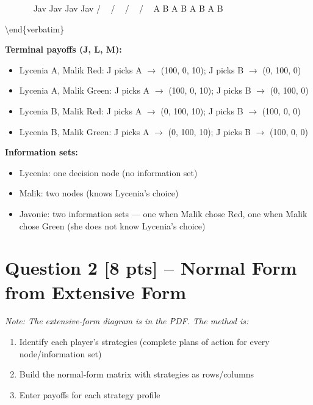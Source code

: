 \documentclass[
]{article}
\providecommand{\tightlist}{%
  \setlength{\itemsep}{0pt}\setlength{\parskip}{0pt}}
\begin{document}
~~~~~~\textbar{} \textbar{} Jav Jav Jav Jav / ~ / ~ / ~ / ~ A B A B A B
A B

\textbackslash end\{verbatim\}

\textbf{Terminal payoffs (J, L, M):}

\begin{itemize}
\tightlist
\item
  Lycenia A, Malik Red: J picks A \(\rightarrow\) (100, 0, 10); J picks
  B \(\rightarrow\) (0, 100, 0)
\item
  Lycenia A, Malik Green: J picks A \(\rightarrow\) (100, 0, 10); J
  picks B \(\rightarrow\) (0, 100, 0)
\item
  Lycenia B, Malik Red: J picks A \(\rightarrow\) (0, 100, 10); J picks
  B \(\rightarrow\) (100, 0, 0)
\item
  Lycenia B, Malik Green: J picks A \(\rightarrow\) (0, 100, 10); J
  picks B \(\rightarrow\) (100, 0, 0)
\end{itemize}

\textbf{Information sets:}

\begin{itemize}
\tightlist
\item
  Lycenia: one decision node (no information set)
\item
  Malik: two nodes (knows Lycenia's choice)
\item
  Javonie: two information sets --- one when Malik chose Red, one when
  Malik chose Green (she does not know Lycenia's choice)
\end{itemize}

\newpage

\section{Question 2 {[}8 pts{]} -- Normal Form from Extensive
Form}\label{question-2-8-pts-normal-form-from-extensive-form}

\emph{Note: The extensive-form diagram is in the PDF. The method is:}

\begin{enumerate}
\def\labelenumi{\arabic{enumi}.}
\tightlist
\item
  Identify each player's strategies (complete plans of action for every
  node/information set)
\item
  Build the normal-form matrix with strategies as rows/columns
\item
  Enter payoffs for each strategy profile
\end{enumerate}
\end{document}
